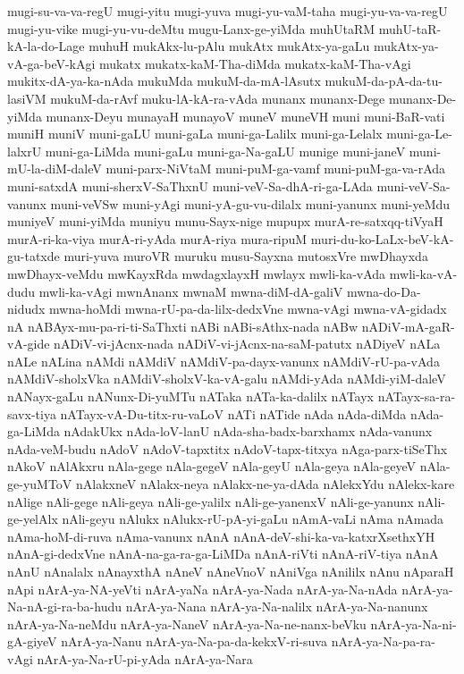 {mugi-su-va-va-regU
mugi-yitu
mugi-yuva
mugi-yu-vaM-taha
mugi-yu-va-va-regU
mugi-yu-vike
mugi-yu-vu-deMtu
mugu-Lanx-ge-yiMda
muhUtaRM
muhU-taR-kA-la-do-Lage
muhuH
mukAkx-lu-pAlu
mukAtx
mukAtx-ya-gaLu
mukAtx-ya-vA-ga-beV-kAgi
mukatx
mukatx-kaM-Tha-diMda
mukatx-kaM-Tha-vAgi
mukitx-dA-ya-ka-nAda
mukuMda
mukuM-da-mA-lAsutx
mukuM-da-pA-da-tu-lasiVM
mukuM-da-rAvf
muku-lA-kA-ra-vAda
munanx
munanx-Dege
munanx-De-yiMda
munanx-Deyu
munayaH
munayoV
muneV
muneVH
muni
muni-BaR-vati
muniH
muniV
muni-gaLU
muni-gaLa
muni-ga-Lalilx
muni-ga-Lelalx
muni-ga-Le-lalxrU
muni-ga-LiMda
muni-gaLu
muni-ga-Na-gaLU
munige
muni-janeV
muni-mU-la-diM-daleV
muni-parx-NiVtaM
muni-puM-ga-vamf
muni-puM-ga-va-rAda
muni-satxdA
muni-sherxV-SaThxnU
muni-veV-Sa-dhA-ri-ga-LAda
muni-veV-Sa-vanunx
muni-veVSw
muni-yAgi
muni-yA-gu-vu-dilalx
muni-yanunx
muni-yeMdu
muniyeV
muni-yiMda
muniyu
munu-Sayx-nige
mupupx
murA-re-satxqq-tiVyaH
murA-ri-ka-viya
murA-ri-yAda
murA-riya
mura-ripuM
muri-du-ko-LaLx-beV-kA-gu-tatxde
muri-yuva
muroVR
muruku
musu-Sayxna
mutosxVre
mwDhayxda
mwDhayx-veMdu
mwKayxRda
mwdagxlayxH
mwlayx
mwli-ka-vAda
mwli-ka-vA-dudu
mwli-ka-vAgi
mwnAnanx
mwnaM
mwna-diM-dA-galiV
mwna-do-Da-nidudx
mwna-hoMdi
mwna-rU-pa-da-lilx-dedxVne
mwna-vAgi
mwna-vA-gidadx
nA
nABAyx-mu-pa-ri-ti-SaThxti
nABi
nABi-sAthx-nada
nABw
nADiV-mA-gaR-vA-gide
nADiV-vi-jAcnx-nada
nADiV-vi-jAcnx-na-saM-patutx
nADiyeV
nALa
nALe
nALina
nAMdi
nAMdiV
nAMdiV-pa-dayx-vanunx
nAMdiV-rU-pa-vAda
nAMdiV-sholxVka
nAMdiV-sholxV-ka-vA-galu
nAMdi-yAda
nAMdi-yiM-daleV
nANayx-gaLu
nANunx-Di-yuMTu
nATaka
nATa-ka-dalilx
nATayx
nATayx-sa-ra-savx-tiya
nATayx-vA-Du-titx-ru-vaLoV
nATi
nATide
nAda
nAda-diMda
nAda-ga-LiMda
nAdakUkx
nAda-loV-lanU
nAda-sha-badx-barxhamx
nAda-vanunx
nAda-veM-budu
nAdoV
nAdoV-tapxtitx
nAdoV-tapx-titxya
nAga-parx-tiSeThx
nAkoV
nAlAkxru
nAla-gege
nAla-gegeV
nAla-geyU
nAla-geya
nAla-geyeV
nAla-ge-yuMToV
nAlakxneV
nAlakx-neya
nAlakx-ne-ya-dAda
nAlekxYdu
nAlekx-kare
nAlige
nAli-gege
nAli-geya
nAli-ge-yalilx
nAli-ge-yanenxV
nAli-ge-yanunx
nAli-ge-yelAlx
nAli-geyu
nAlukx
nAlukx-rU-pA-yi-gaLu
nAmA-vaLi
nAma
nAmada
nAma-hoM-di-ruva
nAma-vanunx
nAnA
nAnA-deV-shi-ka-va-katxrXsethxYH
nAnA-gi-dedxVne
nAnA-na-ga-ra-ga-LiMDa
nAnA-riVti
nAnA-riV-tiya
nAnA‌
nAnU
nAnalalx
nAnayxthA
nAneV
nAneVnoV
nAniVga
nAnililx
nAnu
nAparaH
nApi
nArA-ya-NA-yeVti
nArA-yaNa
nArA-ya-Nada
nArA-ya-Na-nAda
nArA-ya-Na-nA-gi-ra-ba-hudu
nArA-ya-Nana
nArA-ya-Na-nalilx
nArA-ya-Na-nanunx
nArA-ya-Na-neMdu
nArA-ya-NaneV
nArA-ya-Na-ne-nanx-beVku
nArA-ya-Na-ni-gA-giyeV
nArA-ya-Nanu
nArA-ya-Na-pa-da-kekxV-ri-suva
nArA-ya-Na-pa-ra-vAgi
nArA-ya-Na-rU-pi-yAda
nArA-ya-Nara
}
